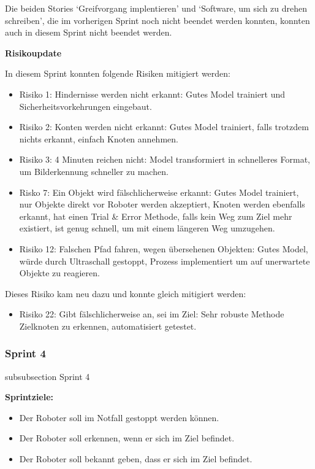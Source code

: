 Die beiden Stories `Greifvorgang implentieren' und `Software, um sich zu drehen schreiben', die im vorherigen Sprint noch nicht beendet werden konnten, konnten auch in diesem Sprint nicht beendet werden.


\textbf{Risikoupdate}

In diesem Sprint konnten folgende Risiken mitigiert werden:

\begin{itemize}
    \item Risiko 1: Hindernisse werden nicht erkannt: Gutes Model trainiert und Sicherheitsvorkehrungen eingebaut.
    \item Risiko 2: Konten werden nicht erkannt: Gutes Model trainiert, falls trotzdem nichts erkannt, einfach Knoten annehmen.
    \item Risiko 3: 4 Minuten reichen nicht: Model transformiert in schnelleres Format, um Bilderkennung schneller zu machen.
    \item Risko 7: Ein Objekt wird fälschlicherweise erkannt: Gutes Model trainiert, nur Objekte direkt vor Roboter werden akzeptiert, Knoten werden ebenfalls erkannt, hat einen Trial \& Error Methode, falls kein Weg zum Ziel mehr existiert, ist genug schnell, um mit einem längeren Weg umzugehen.
    \item Risiko 12: Falschen Pfad fahren, wegen übersehenen Objekten: Gutes Model, würde durch Ultraschall gestoppt, Prozess implementiert um auf unerwartete Objekte zu reagieren.
    
\end{itemize}

Dieses Risiko kam neu dazu und konnte gleich mitigiert werden:

\begin{itemize}
    \item Risiko 22: Gibt fälschlicherweise an, sei im Ziel: Sehr robuste Methode Zielknoten zu erkennen, automatisiert getestet.
\end{itemize}

\newpage


\subsubsection*{Sprint 4}
    {subsubsection}
    {Sprint 4}
    
\textbf{Sprintziele:}
\begin{itemize}
    \item Der Roboter soll im Notfall gestoppt werden können.
    \item Der Roboter soll erkennen, wenn er sich im Ziel befindet.
    \item Der Roboter soll bekannt geben, dass er sich im Ziel befindet.
\end{itemize}

